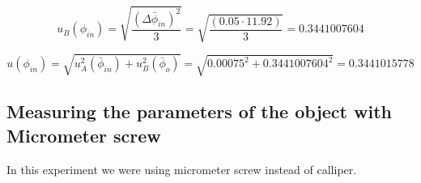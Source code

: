 \begin{equation}
u_B(\phi_{in}) = \sqrt{\frac{(\Delta{\bar\phi_{in}})^2}{3}}=
\sqrt{\frac{(0.05 \cdot 11.92)}{3}} 
=0.3441007604
\end{equation}

\begin{equation}
	u(\phi_{in}) = \sqrt{u_A^2(\bar\phi_{in})+u_B^2(\bar\phi_{o})}
	=\sqrt{0.00075^2+0.3441007604^2}=0.3441015778
\end{equation}



\subsection{Measuring the parameters of the object with Micrometer screw}
In this experiment we were using micrometer screw instead of calliper. 

